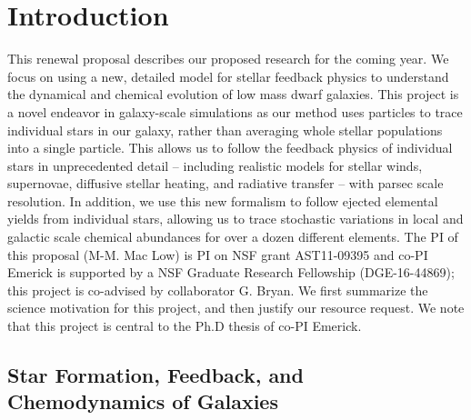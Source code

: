 \documentclass[11pt]{article}
\begin{document}
\maketitle

\section{Introduction}
This renewal proposal describes our proposed research for the coming year. We focus on using a new, detailed model for stellar feedback physics to understand the dynamical and chemical evolution of low mass dwarf galaxies. This project is a novel endeavor in galaxy-scale simulations as our method uses particles to trace individual stars in our galaxy, rather than averaging whole stellar populations into a single particle. This allows us to follow the feedback physics of individual stars in unprecedented detail -- including realistic models for stellar winds, supernovae, diffusive stellar heating, and radiative transfer -- with parsec scale resolution. In addition, we use this new formalism to follow ejected elemental yields from individual stars, allowing us to trace stochastic variations in local and galactic scale chemical abundances for over a dozen different elements. The PI of this proposal (M-M. Mac Low) is PI on NSF grant AST11-09395 and co-PI Emerick is supported by a NSF Graduate Research Fellowship (DGE-16-44869); this project is co-advised by collaborator G. Bryan. We first summarize the science motivation for this project, and then justify our resource request. We note that this project is central to the Ph.D thesis of co-PI Emerick.

\subsection{Star Formation, Feedback, and Chemodynamics of Galaxies}
\end{document}
